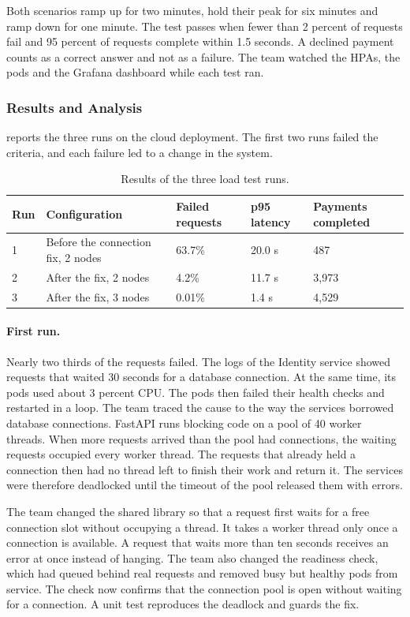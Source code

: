 \documentclass[11pt,a4paper]{article}
\begin{document}
Both scenarios ramp up for two minutes, hold their peak for six minutes and ramp down for one minute. The test passes when fewer than 2 percent of requests fail and 95 percent of requests complete within 1.5 seconds. A declined payment counts as a correct answer and not as a failure. The team watched the HPAs, the pods and the Grafana dashboard while each test ran.

\subsubsection{Results and Analysis}

 reports the three runs on the cloud deployment. The first two runs failed the criteria, and each failure led to a change in the system.

\begin{table}[H]\centering\small
\caption{Results of the three load test runs.}\label{tab:loadtest}
\begin{tabular}{@{}lllll@{}}
\toprule
Run & Configuration & Failed requests & p95 latency & Payments completed \\
\midrule
1 & Before the connection fix, 2 nodes & 63.7\% & 20.0 s & 487 \\
2 & After the fix, 2 nodes & 4.2\% & 11.7 s & 3,973 \\
3 & After the fix, 3 nodes & 0.01\% & 1.4 s & 4,529 \\
\bottomrule
\end{tabular}
\end{table}

\paragraph{First run.} Nearly two thirds of the requests failed. The logs of the Identity service showed requests that waited 30 seconds for a database connection. At the same time, its pods used about 3 percent CPU. The pods then failed their health checks and restarted in a loop. The team traced the cause to the way the services borrowed database connections. FastAPI runs blocking code on a pool of 40 worker threads. When more requests arrived than the pool had connections, the waiting requests occupied every worker thread. The requests that already held a connection then had no thread left to finish their work and return it. The services were therefore deadlocked until the timeout of the pool released them with errors.

The team changed the shared library so that a request first waits for a free connection slot without occupying a thread. It takes a worker thread only once a connection is available. A request that waits more than ten seconds receives an error at once instead of hanging. The team also changed the readiness check, which had queued behind real requests and removed busy but healthy pods from service. The check now confirms that the connection pool is open without waiting for a connection. A unit test reproduces the deadlock and guards the fix.
\end{document}
